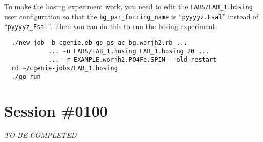 \documentclass[a4paper,10pt,article]{memoir}
\begin{document}
To make the hosing experiment work, you need to edit the
\texttt{LABS/LAB\_1.hosing} user configuration so that the
\texttt{bg\_par\_forcing\_name} is ``\texttt{pyyyyz.Fsal}'' instead of
``\texttt{pyyyyz\_Fsal}''.  Then you can do this to run the hosing
experiment:
\begin{verbatim}
  ./new-job -b cgenie.eb_go_gs_ac_bg.worjh2.rb ...
            ... -u LABS/LAB_1.hosing LAB_1.hosing 20 ...
            ... -r EXAMPLE.worjh2.PO4Fe.SPIN --old-restart
  cd ~/cgenie-jobs/LAB_1.hosing
  ./go run
\end{verbatim}

\section{Session \#0100}

\emph{TO BE COMPLETED}
\end{document}
